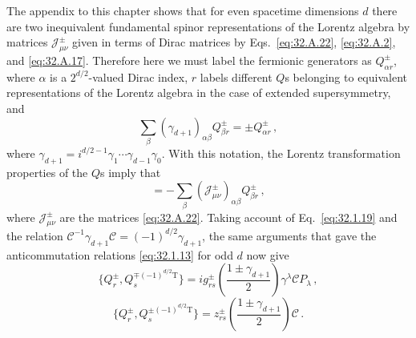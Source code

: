 The appendix to this chapter shows that for even spacetime dimensions \(d\)
there are two inequivalent fundamental spinor representations of the Lorentz
algebra by matrices \(\mathcal J_{\mu\nu}^{\pm}\) given in terms of Dirac
matrices by Eqs.~\eqref{eq:32.A.22}, \eqref{eq:32.A.2}, and
\eqref{eq:32.A.17}. Therefore here we must label the fermionic generators as
\(Q_{\alpha r}^{\pm}\), where \(\alpha\) is a \(2^{d/2}\)-valued Dirac
index, \(r\) labels different \(Q\)s belonging to equivalent
representations of the Lorentz algebra in the case of extended
supersymmetry, and
\begin{equation}
  \sum_\beta(\gamma_{d+1})_{\alpha\beta}Q_{\beta r}^{\pm}
  =\pm Q_{\alpha r}^{\pm}\,,
  \tag{32.1.19}\label{eq:32.1.19}
\end{equation}
where
\(\gamma_{d+1}=i^{d/2-1}\gamma_1\cdots\gamma_{d-1}\gamma_0\). With this
notation, the Lorentz transformation properties of the \(Q\)s imply that
\begin{equation}
  [J_{\mu\nu},Q_{\alpha r}^{\pm}]
  =-\sum_\beta(\mathcal J_{\mu\nu}^{\pm})_{\alpha\beta}
  Q_{\beta r}^{\pm}\,,
  \tag{32.1.20}\label{eq:32.1.20}
\end{equation}
where \(\mathcal J_{\mu\nu}^{\pm}\) are the matrices
\eqref{eq:32.A.22}. Taking account of Eq.~\eqref{eq:32.1.19} and the
relation
\(\mathcal C^{-1}\gamma_{d+1}\mathcal C=(-1)^{d/2}\gamma_{d+1}\), the same
arguments that gave the anticommutation relations \eqref{eq:32.1.13} for
odd \(d\) now give
\begin{equation}
  \{Q_r^\pm,Q_s^{\mp(-1)^{d/2}\mathrm T}\}
  =ig_{rs}^{\pm}
  \left(\frac{1\pm\gamma_{d+1}}{2}\right)
  \gamma^\lambda\mathcal C P_\lambda\,,
  \tag{32.1.21}\label{eq:32.1.21}
\end{equation}
\begin{equation}
  \{Q_r^\pm,Q_s^{\pm(-1)^{d/2}\mathrm T}\}
  =z_{rs}^{\pm}
  \left(\frac{1\pm\gamma_{d+1}}{2}\right)\mathcal C\,.
  \tag{32.1.22}\label{eq:32.1.22}
\end{equation}

